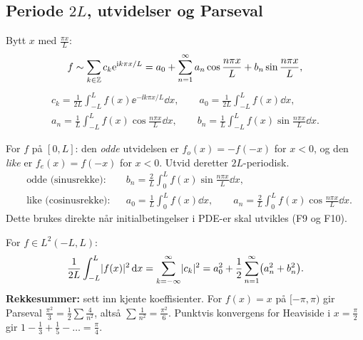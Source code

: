 \subsection{Periode $2L$, utvidelser og Parseval}
\begin{formel}
Bytt $x$ med $\frac{\pi x}{L}$:
\[
f\sim\sum_{k\in\mathbb{Z}}c_k\mathrm{e}^{\mathrm{i} k\pi x/L}=a_0+\sum_{n=1}^\infty a_n\cos\frac{n\pi x}L+b_n\sin\frac{n\pi x}L,
\]
\begin{gather*}
c_k=\frac1{2L}\int_{-L}^{L}f(x)\ee^{-\ii k\pi x/L}\dd x,\qquad a_0=\frac1{2L}\int_{-L}^Lf(x)\dd x,\\
a_n=\frac1L\int_{-L}^Lf(x)\cos\frac{n\pi x}L\dd x,\qquad b_n=\frac1L\int_{-L}^Lf(x)\sin\frac{n\pi x}L\dd x.
\end{gather*}
\end{formel}
\begin{defn}
For $f$ på $[0,L]$: den \emph{odde} utvidelsen er $f_o(x)=-f(-x)$ for $x<0$, og den \emph{like} er $f_e(x)=f(-x)$ for $x<0$. Utvid deretter $2L$-periodisk.
\begin{align*}
&\text{odde (sinusrekke):} && b_n=\frac2L\int_0^Lf(x)\sin\frac{n\pi x}L\dd x,\\
&\text{like (cosinusrekke):} && a_0=\frac1L\int_0^Lf(x)\dd x,\qquad a_n=\frac2L\int_0^Lf(x)\cos\frac{n\pi x}L\dd x.
\end{align*}
Dette brukes direkte når initialbetingelser i PDE-er skal utvikles (F9 og F10).
\end{defn}
\begin{teorem}
For $f\in L^2(-L,L)$:
\[
\frac1{2L}\int_{-L}^{L}\lvert f(x)\rvert^2\,\mathrm{d} x=\sum_{k=-\infty}^{\infty}\lvert c_k\rvert^2=a_0^2+\frac12\sum_{n=1}^{\infty}\bigl(a_n^2+b_n^2\bigr).
\]
\textbf{Rekkesummer:} sett inn kjente koeffisienter. For $f(x)=x$ på $[-\pi,\pi)$ gir Parseval $\frac{\pi^2}3=\frac12\sum\frac{4}{n^2}$, altså $\sum\frac1{n^2}=\frac{\pi^2}6$. Punktvis konvergens for Heaviside i $x=\frac\pi2$ gir $1-\frac13+\frac15-\dots=\frac\pi4$.
\end{teorem}

